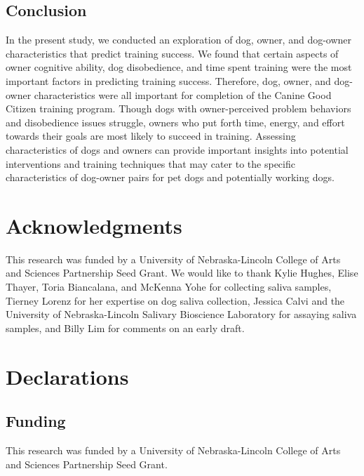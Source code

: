 \documentclass[
  english,
  ,pub,floatsintext]{apa6}
\begin{document}
\hypertarget{conclusion}{%
\subsection{Conclusion}\label{conclusion}}

In the present study, we conducted an exploration of dog, owner, and dog-owner characteristics that predict training success. We found that certain aspects of owner cognitive ability, dog disobedience, and time spent training were the most important factors in predicting training success. Therefore, dog, owner, and dog-owner characteristics were all important for completion of the Canine Good Citizen training program. Though dogs with owner-perceived problem behaviors and disobedience issues struggle, owners who put forth time, energy, and effort towards their goals are most likely to succeed in training. Assessing characteristics of dogs and owners can provide important insights into potential interventions and training techniques that may cater to the specific characteristics of dog-owner pairs for pet dogs and potentially working dogs.

\hypertarget{acknowledgments}{%
\section{Acknowledgments}\label{acknowledgments}}

This research was funded by a University of Nebraska-Lincoln College of Arts and Sciences Partnership Seed Grant. We would like to thank Kylie Hughes, Elise Thayer, Toria Biancalana, and McKenna Yohe for collecting saliva samples, Tierney Lorenz for her expertise on dog saliva collection, Jessica Calvi and the University of Nebraska-Lincoln Salivary Bioscience Laboratory for assaying saliva samples, and Billy Lim for comments on an early draft.

\hypertarget{declarations}{%
\section{Declarations}\label{declarations}}

\hypertarget{funding}{%
\subsection{Funding}\label{funding}}

This research was funded by a University of Nebraska-Lincoln College of Arts and Sciences Partnership Seed Grant.
\end{document}
